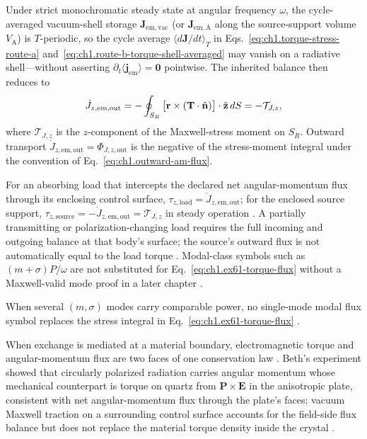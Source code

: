 Under strict monochromatic steady state at angular frequency $\omega$, the cycle-averaged vacuum-shell storage $\mathbf{J}_{\mathrm{em,vac}}$ (or $\mathbf{J}_{\mathrm{em,A}}$ along the source-support volume $V_{\mathrm{A}}$) is $T$-periodic, so the cycle average $\langle d\mathbf{J}/dt\rangle_T$ in Eqs.~\eqref{eq:ch1.torque-stress-route-a} and~\eqref{eq:ch1.route-b-torque-shell-averaged} may vanish on a radiative shell---without asserting $\partial_t\langle\mathbf{j}_{\mathrm{em}}\rangle=\mathbf{0}$ pointwise. The inherited balance then reduces to
\begin{equation}
\label{eq:ch1.ex61-torque-flux}
\dot J_{z,\mathrm{em,out}}
=
-\oint_{S_R}
\big[\mathbf{r}\times(\mathbf{T}\cdot\hat{\mathbf{n}})\big]\cdot\hat{\mathbf{z}}\,dS
=-\mathcal{T}_{J,z},
\end{equation}
where \(\mathcal{T}_{J,z}\) is the $z$-component of the Maxwell-stress moment on \(S_R\). Outward transport \(\dot J_{z,\mathrm{em,out}}=\Phi_{J,z,\mathrm{out}}\) is the negative of the stress-moment integral under the convention of Eq.~\eqref{eq:ch1.outward-am-flux}.

For an absorbing load that intercepts the declared net angular-momentum flux through its enclosing control surface, \(\tau_{z,\mathrm{load}}=\dot J_{z,\mathrm{em,out}}\); for the enclosed source support, \(\tau_{z,\mathrm{source}}=-\dot J_{z,\mathrm{em,out}}=\mathcal{T}_{J,z}\) in steady operation \cite{beth1936}. A partially transmitting or polarization-changing load requires the full incoming and outgoing balance at that body’s surface; the source’s outward flux is not automatically equal to the load torque \cite{beth1936,stratton1941}. Modal-class symbols such as $(m+\sigma)P/\omega$ are not substituted for Eq.~\eqref{eq:ch1.ex61-torque-flux} without a Maxwell-valid mode proof in a later chapter \cite{stratton1941}.

When several \((m,\sigma)\) modes carry comparable power, no single-mode modal flux symbol replaces the stress integral in Eq.~\eqref{eq:ch1.ex61-torque-flux} \cite{stratton1941}.

When exchange is mediated at a material boundary, electromagnetic torque and angular-momentum flux are two faces of one conservation law \cite{beth1936}. Beth's experiment showed that circularly polarized radiation carries angular momentum whose mechanical counterpart is torque on quartz from $\mathbf P\times\mathbf E$ in the anisotropic plate, consistent with net angular-momentum flux through the plate's faces; vacuum Maxwell traction on a surrounding control surface accounts for the field-side flux balance but does not replace the material torque density inside the crystal \cite{beth1936,stratton1941}.

